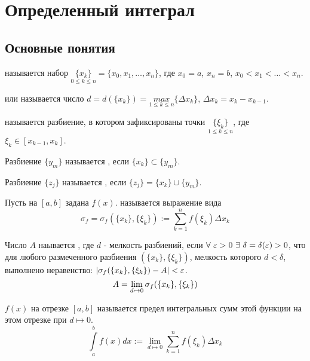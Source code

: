 \chapter{Определенный интеграл}
\section{Основные понятия}
\begin{opred}
 называется набор $\underset{0\leq k\leq n}{\{x_k\}}=\{x_0,x_1,\ldots,x_n\}$, где $x_0=a$, $x_n=b$, $x_0<x_1<\ldots<x_n$.
\end{opred}
\begin{opred}
 или  называется число $d=d(\{x_k\})=\underset{1\leq k\leq n}{max}\{\Delta x_k\}$, $\Delta x_k=x_k-x_{k-1}$.
\end{opred}
\begin{opred}
 называется разбиение, в котором зафиксированы точки $\underset{1\leq k\leq n}{\{\xi_k\}}$, где $\xi_k\in[x_{k-1},x_k]$.
\end{opred}
\begin{opred}
Разбиение $\{y_m\}$ называется , если $\{x_k\}\subset\{y_m\}$.
\end{opred}
\begin{opred}
Разбиение $\{z_j\}$ называется , если $\{z_j\}=\{x_k\}\cup\{y_m\}$.
\end{opred}
\begin{opred}
Пусть на $[a,b]$ задана $f(x)$.  называется выражение вида $$\sigma_f=\sigma_f(\{x_k\},\{\xi_k\}):=\sum\limits^n_{k=1}f(\xi_k)\Delta x_k$$
\end{opred}
\begin{opred}
Число $A$ наывается , где $d$ - мелкость разбиений, если $\forall\ \eps>0\ \exists\ \delta=\delta(\eps)>0$, что для любого размеченного разбиения $(\{x_k\},\{\xi_k\})$, мелкость которого $d<\delta$, выполнено неравенство: $|\sigma_f(\{x_k\},\{\xi_k\})-A|<\varepsilon$.
$$A=\lim\limits_{d\mapsto0}\sigma_f(\{x_k\},\{\xi_k\})$$
\end{opred}
\begin{opred}
 $f(x)$ на отрезке $[a,b]$ называется предел интегральных сумм этой функции на этом отрезке при $d\mapsto0$.
$$\int\limits^b_af(x)dx:=\lim\limits_{d\mapsto0}\sum\limits^n_{k=1}f(\xi_k)\Delta x_k$$
\end{opred}
